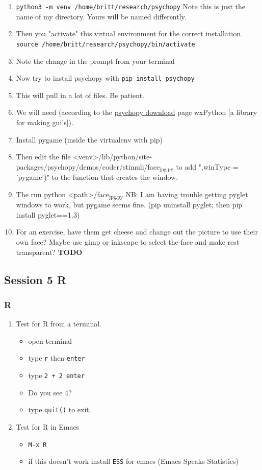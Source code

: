 \documentclass{article}
\begin{document}
\begin{enumerate}
\begin{enumerate}
\begin{enumerate}
\begin{enumerate}
\item \texttt{python3 -m venv /home/britt/research/psychopy}
Note this is just the name of my directory. Yours will be named differently.
\item Then you "activate" this virtual environment for the correct installation.
\texttt{source /home/britt/research/psychopy/bin/activate}
\item Note the change in the prompt from your terminal
\item Now try to install psychopy with
\texttt{pip install psychopy}
\item This will pull in  a lot of files. Be patient.
\item We will need (according to the \href{https://www.psychopy.org/download.html\#download}{psychopy download} page wxPython [a library for making gui's]).
\item Install pygame (inside the virtualenv with pip)
\item Then edit the file <venv>/lib/python/site-packages/psychopy/demos/coder/stimuli/face\(_{\text{jpg.py}}\) to add ",winType = 'pygame')" to the function that creates the window.
\item The run python <path>/face\(_{\text{jpg.py}}\)
NB: I am having trouble getting pyglet windows to work, but pygame seems fine. (pip uninstall pyglet; then pip install pyglet==1.3)
\item For an exercise, have them get cheese and change out the picture to use their own face? Maybe use gimp or inkscape to select the face and make rest transparent? \textbf{\textbf{TODO}}
\end{enumerate}
\end{enumerate}
\end{enumerate}
\end{enumerate}
\subsection{Session 5 R}
\label{sec:org33ed5c9}
\subsubsection{R}
\label{sec:org6d5f80a}
\begin{enumerate}
\item Test for R from a terminal.
\begin{itemize}
\item open terminal
\item type \texttt{r} then \texttt{enter}
\item type \texttt{2 + 2 enter}
\item Do you see 4?
\item type \texttt{quit()} to exit.
\end{itemize}
\item Test for R in Emacs
\begin{itemize}
\item \texttt{M-x R}
\item if this doesn't work install \texttt{ESS} for emacs (Emacs Speaks Statistics)
\end{itemize}
\end{enumerate}
\end{document}
